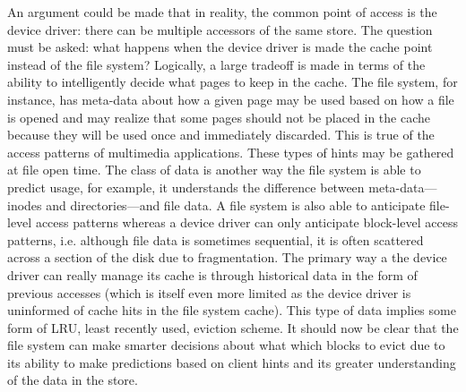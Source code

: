 An argument could be made that in reality, the common point of access
is the device driver: there can be multiple accessors of the same
store.  The question must be asked: what happens when the device
driver is made the cache point instead of the file system?  Logically,
a large tradeoff is made in terms of the ability to intelligently
decide what pages to keep in the cache.  The file system, for
instance, has meta-data about how a given page may be used based on
how a file is opened and may realize that some pages should not be
placed in the cache because they will be used once and immediately
discarded.  This is true of the access patterns of multimedia
applications.  These types of hints may be gathered at file open time.
The class of data is another way the file system is able to predict
usage, for example, it understands the difference between
meta-data---inodes and directories---and file data.  A file system is
also able to anticipate file-level access patterns whereas a device
driver can only anticipate block-level access patterns, i.e. although
file data is sometimes sequential, it is often scattered across a
section of the disk due to fragmentation.  The primary way a the
device driver can really manage its cache is through historical data
in the form of previous accesses (which is itself even more limited as
the device driver is uninformed of cache hits in the file system
cache).  This type of data implies some form of LRU, least recently
used, eviction scheme.  It should now be clear that the file system
can make smarter decisions about what which blocks to evict due to its
ability to make predictions based on client hints and its greater
understanding of the data in the store.

